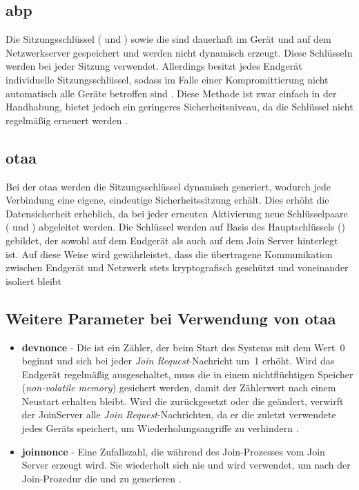 \subsection{\acf{abp}}
	Die Sitzungsschlüssel ( und ) sowie die  sind dauerhaft im Gerät und auf dem Netzwerkserver gespeichert und werden nicht dynamisch erzeugt. Diese Schlüsseln werden bei jeder Sitzung verwendet. Allerdings besitzt jedes Endgerät individuelle Sitzungsschlüssel, sodass im Falle einer Kompromittierung nicht automatisch alle Geräte betroffen sind \cite[48]{Semtech:2024}. Diese Methode ist zwar einfach in der Handhabung, bietet jedoch ein geringeres Sicherheitsniveau, da die Schlüssel nicht regelmä{\ss}ig erneuert werden \cite{Montagny:2022}.

\subsection{\acf{otaa}}
	Bei der \ac{otaa} werden die Sitzungsschlüssel dynamisch generiert, wodurch jede Verbindung eine eigene, eindeutige Sicherheitssitzung erhält. Dies erhöht die Datensicherheit erheblich, da bei jeder erneuten Aktivierung neue Schlüsselpaare ( und ) abgeleitet werden. Die Schlüssel werden auf Basis des Hauptschlüssels () gebildet, der sowohl auf dem Endgerät als auch auf dem Join Server hinterlegt ist. Auf diese Weise wird gewährleistet, dass die übertragene Kommunikation zwischen Endgerät und Netzwerk stets kryptografisch geschützt und voneinander isoliert bleibt \cite{LoRaAlliance:2020b, Semtech:2024, Montagny:2022}

\subsection{Weitere Parameter bei Verwendung von \ac{otaa}}
	\begin{itemize}
		\item \textbf{\acl{devnonce}}  - Die  ist ein Zähler, der beim Start des Systems mit dem Wert~0 beginnt und sich bei jeder \textit{Join Request}-Nachricht um~1 erhöht. Wird das Endgerät regelmä{\ss}ig ausgeschaltet, muss die  in einem nichtflüchtigen Speicher (\textit{non-volatile memory}) gesichert werden, damit der Zählerwert nach einem Neustart erhalten bleibt. Wird die  zurückgesetzt oder die  geändert, verwirft der JoinServer alle \textit{Join Request}-Nachrichten, da er die zuletzt verwendete  jedes Geräts speichert, um Wiederholungsangriffe zu verhindern \cite[45]{LoRaAlliance:2020b}.
		\item \textbf{\acl{joinnonce}} - Eine Zufallszahl, die während des Join-Prozesses vom Join Server erzeugt wird. Sie wiederholt sich nie und wird verwendet, um nach der Join-Prozedur die  und  zu generieren \cite[46]{LoRaAlliance:2020b}.
	\end{itemize}

